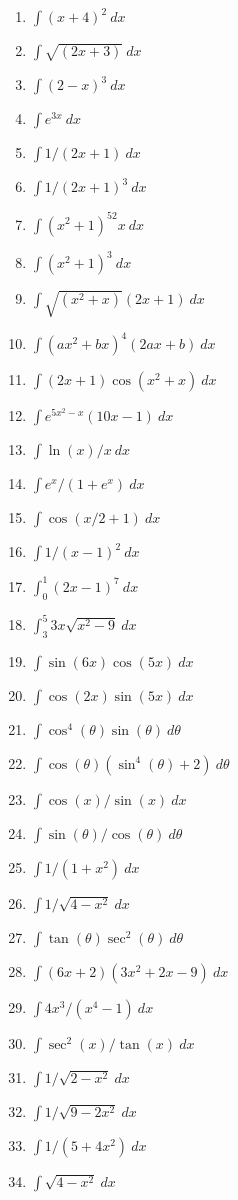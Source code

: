 \documentclass[
  english,
  11pt,
  oneside]{book}
\providecommand{\tightlist}{%
  \setlength{\itemsep}{0pt}\setlength{\parskip}{0pt}}
\theoremstyle{definition}
\theoremstyle{definition}
\theoremstyle{definition}
\theoremstyle{definition}
\theoremstyle{remark}
\begin{document}
\begin{enumerate}
\def\labelenumi{\arabic{enumi}.}
\tightlist
\item
  \(\int (x+4)^2\ dx\)
\item
  \(\int \sqrt{(2x+3)}\ dx\)
\item
  \(\int (2-x)^3\ dx\)
\item
  \(\int e^{3x}\ dx\)
\item
  \(\int 1/(2x+1)\ dx\)
\item
  \(\int 1/(2x+1)^3\ dx\)
\item
  \(\int (x^2+1)^52x \ dx\)
\item
  \(\int (x^2+1)^3\ dx\)
\item
  \(\int \sqrt{(x^2+x)}(2x+1) \ dx\)
\item
  \(\int (ax^2+bx)^4(2ax+b)\ dx\)
\item
  \(\int (2x+1)\cos(x^2+x) \ dx\)
\item
  \(\int e^{5x^2-x}(10x-1)\ dx\)
\item
  \(\int \ln(x)/x \ dx\)
\item
  \(\int e^x/(1+e^x)\ dx\)
\item
  \(\int \cos(x/2+1)\ dx\)
\item
  \(\int 1/(x-1)^2\ dx\)
\item
  \(\int_0^1 (2x-1)^7\ dx\)
\item
  \(\int_3^5 3x\sqrt{x^2-9}\ dx\)
\item
  \(\int\sin(6x)\cos(5x) \ dx\)
\item
  \(\int \cos(2x)\sin(5x)\ dx\)
\item
  \(\int \cos^4(\theta)\sin(\theta)\ d\theta\)
\item
  \(\int \cos(\theta)(\sin^4(\theta)+2)\ d\theta\)
\item
  \(\int \cos(x)/\sin(x)\ dx\)
\item
  \(\int \sin(\theta)/\cos(\theta)\ d\theta\)
\item
  \(\int 1/(1+x^2)\ dx\)
\item
  \(\int 1/\sqrt{4-x^2}\ dx\)
\item
  \(\int \tan(\theta)\sec^2(\theta)\ d\theta\)
\item
  \(\int (6x+2)(3x^2+2x-9)\ dx\)
\item
  \(\int 4x^3/(x^4-1)\ dx\)
\item
  \(\int \sec^2(x)/\tan(x)\ dx\)
\item
  \(\int 1/\sqrt{2-x^2}\ dx\)
\item
  \(\int 1/\sqrt{9-2x^2}\ dx\)
\item
  \(\int 1/(5+4x^2)\ dx\)
\item
  \(\int \sqrt{4-x^2}\ dx\)
\end{enumerate}
\end{document}

